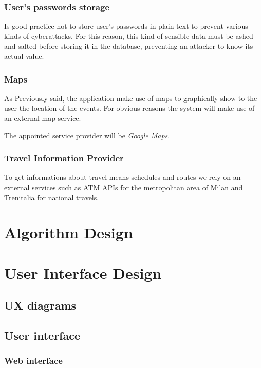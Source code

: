 \documentclass{article}
\begin{document}
	\subsubsection{User's passwords storage}
	Is good practice not to store user's passwords in plain text to prevent various kinds of cyberattacks. For this reason, this kind of sensible data must be ashed and salted before storing it in the database, preventing an attacker to know its actual value. 


	\subsubsection{Maps}
	As Previously said, the application make use of maps to graphically show to the user the location of the events. For obvious reasons the system will make use of an external map service.

	The appointed service provider will be \textit{Google Maps}.


	\subsubsection{Travel Information Provider}
	To get informations about travel means schedules and routes we rely on an external services such as ATM APIs for the metropolitan area of Milan and Trenitalia for national travels.


	\section{Algorithm Design}


	\section{User Interface Design}


	\subsection{UX diagrams}


	\subsection{User interface}


	\subsubsection{Web interface}
\end{document}
